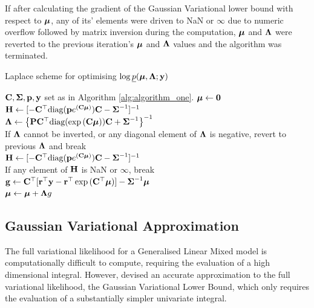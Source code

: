 If after calculating the gradient of the Gaussian Variational lower bound with
respect to ${\boldsymbol \mu}$, any of its' elements were driven to NaN or $\infty$ due to
numeric overflow followed by matrix inversion during the computation, ${\boldsymbol \mu}$
and ${\boldsymbol \Lambda}$ were reverted to the previous iteration's ${\boldsymbol \mu}$ and ${\boldsymbol \Lambda}$
values and the algorithm was terminated.
		
\begin{algorithm}
	\caption{Laplace scheme for optimising $\log \underline{p}({\boldsymbol \mu}, {\boldsymbol \Lambda}; {\bf y})$}
	\label{alg:laplace_alg}
	\begin{algorithmic}
		\REQUIRE ${\bf C}, {\boldsymbol \Sigma}, {\bf p}, {\bf y}$ set as in Algorithm \ref{alg:algorithm_one}.
		\STATE ${\boldsymbol \mu} \leftarrow {\bf0}$ \\ [1ex]
		\STATE ${\bf H} \leftarrow [- {\bf C}^\top \text{diag}({\bf p} e^{({\bf C} {\boldsymbol \mu})}) {\bf C} - {\boldsymbol \Sigma}^{-1}]^{-1}$ \\ [1ex]
		\STATE ${\boldsymbol \Lambda} \leftarrow \left \{{\bf P} {\bf C}^\top \text{diag}(\exp{({\bf C}{\boldsymbol\mu})}) {\bf C} + {\boldsymbol \Sigma}^{-1} \right \}^{-1}$ \\ [1ex] 
		If ${\boldsymbol \Lambda}$ cannot be inverted, or any diagonal element of ${\boldsymbol \Lambda}$ is negative, revert to previous
		${\boldsymbol \Lambda}$ and break \\ [1ex]
		\STATE ${\bf H}
		\leftarrow [- {\bf C}^\top \text{diag}({\bf p} e^{({\bf C} {\boldsymbol \mu})}) {\bf C} - {\boldsymbol \Sigma}^{-1}]^{-1}$ \\ [1ex]
		If any element of ${\bf H}$ is NaN or $\infty$, break \\ [1ex]
		\STATE ${\bf g} \leftarrow {\bf C}^\top[{\bf r}^\top{\bf y} - {\bf r}^\top\exp{({\bf C}^\top{\boldsymbol\mu})}] - {\boldsymbol \Sigma}^{-1}{\boldsymbol \mu}$ \\ [1ex]
		\STATE ${\boldsymbol \mu} \leftarrow {\boldsymbol\mu} + {\boldsymbol \Lambda} g$ \\ [1ex]
		\ENDWHILE
	\end{algorithmic}
\end{algorithm}
		
\subsection{Gaussian Variational Approximation}
		
The full variational likelihood for a Generalised Linear Mixed model is
computationally difficult to compute, requiring the evaluation of a high
dimensional integral. However, \cite{Ormerod2012} devised an accurate
approximation to the full variational likelihood, the Gaussian Variational
Lower Bound, which only requires the evaluation of a substantially simpler
univariate integral.
	
